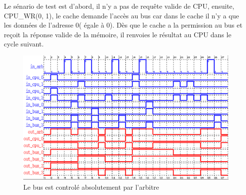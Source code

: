 \documentclass[a4paper,11pt]{report}
\begin{document}
	Le sénario de test est d'abord, il n'y a pas de requête valide de CPU, ensuite, CPU_WR(0, 1), le cache demande l'accès au bus car dans le cache il n'y a que les données de l'adresse 0( égale à 0). Dès que le cache a la permission au bus et reçoit la réponse valide de la mémoire, il renvoies le résultat au CPU dans le cycle suivant.
	\begin{figure}[!htbp]	
		\includegraphics[width = 16cm]{cache_diag.png}
		\caption{Le bus est controlé absolutement par l'arbitre}
	\end{figure}
\end{document}
